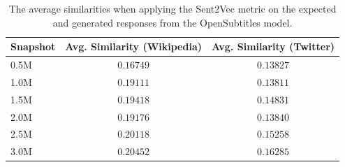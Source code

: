 \begin{table}[H]
	\centering
	\begin{adjustbox}{max width=\textwidth}
		\begin{tabular}{lcc}
			\toprule
			Snapshot & Avg. Similarity (Wikipedia) & Avg. Similarity (Twitter)\\
			\midrule
			0.5M & $0.16749$ & $0.13827$\\
			1.0M & $0.19111$ & $0.13811$\\
			1.5M & $0.19418$ & $0.14831$\\
			2.0M & $0.19176$ & $0.13840$\\
			2.5M & $0.20118$ & $0.15258$\\
			3.0M & $0.20452$ & $0.16285$\\
			\bottomrule
		\end{tabular}
	\end{adjustbox}
	\caption{The average similarities when applying the Sent2Vec metric on the expected and generated responses from the OpenSubtitles model.}
	\label{results:sent2vec:opensubtitles:results_table}
\end{table}

